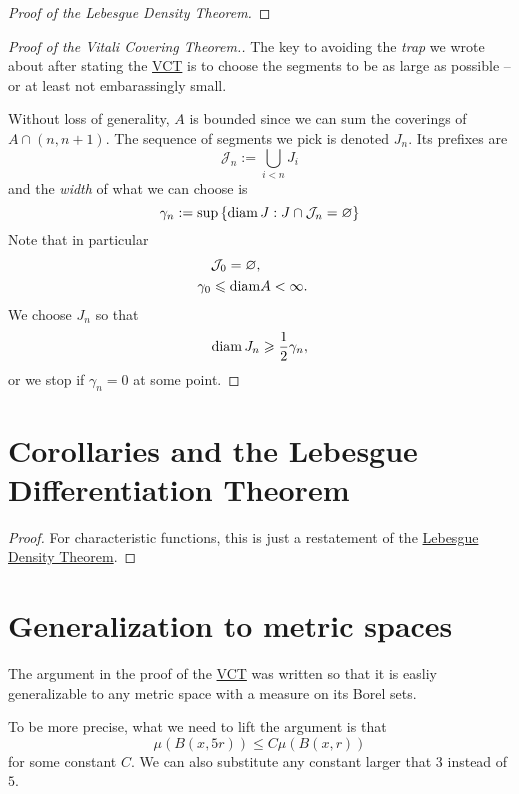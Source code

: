 \begin{proof}[Proof of the Lebesgue Density Theorem]
\end{proof}

\begin{proof}[Proof of the Vitali Covering Theorem.]
    The key to avoiding the \emph{trap} we wrote about after stating the \hyperlink{VitaliCoveringTheorem}{VCT} is to choose the segments to be as large as possible -- or at least not embarassingly small.

    Without loss of generality, \( A \) is bounded since we can sum the coverings of \( A \cap (n,n+1) \). The sequence of segments we pick is denoted \( J_n \). Its prefixes are
    \[ 
        \mathcal{J}_n := \bigcup_{i < n} J_i
   \]
   and the \emph{width} of what we can choose is
    \[ 
       \gamma_n := \sup \left\{ \operatorname{diam} J : J \cap \mathcal{J}_n = \varnothing \right\}
    \]
    Note that in particular
    \begin{align*}
        \mathcal{J}_0 = \varnothing, \\
        \gamma_0 \leqslant \operatorname{diam} &A < \infty.
    \end{align*}
    We choose \( J_n \) so that
    \[ 
       \operatorname{diam} J_n \geqslant \frac{1}{2}\gamma_n,
   \]
   or we stop if \( \gamma_n = 0 \) at some point.
\end{proof}

\section{Corollaries and the Lebesgue Differentiation Theorem}


\begin{proof}
    For characteristic functions, this is just a restatement of the \hyperlink{LebesgueDensityTheorem}{Lebesgue Density Theorem}.
\end{proof}

\section{Generalization to metric spaces}

The argument in the proof of the \hyperlink{VitaliCoveringTheorem}{VCT} was written so that it is easliy generalizable to any metric space with a measure on its Borel sets. 

To be more precise, what we need to lift the argument is that
\[ 
    \mu \left( B(x, 5r) \right) \leqslant C \mu \left( B(x,r) \right)
\]
for some constant \( C \). We can also substitute any constant larger that 3 instead of \( 5 \).
